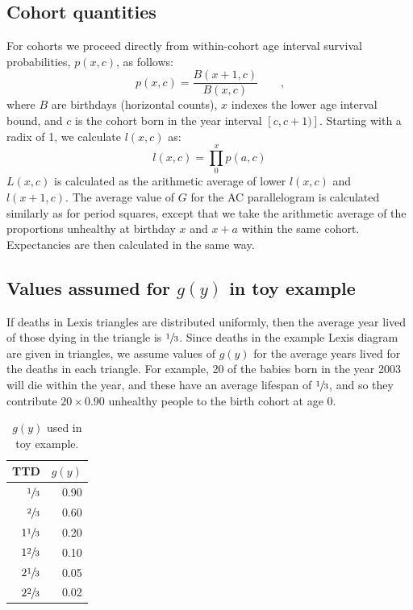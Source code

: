 \documentclass[11pt,oneside,a4paper]{article} %
\newcommand{\tc}{\quad\quad\text{,}}
\begin{document}
\subsection{Cohort quantities}
For cohorts we proceed directly from within-cohort age interval survival
probabilities, $p(x,c)$, as follows:
\begin{equation}
p(x,c) = \frac{B(x+1,c)}{B(x,c)} \tc
\end{equation}
where $B$ are birthdays (horizontal counts), $x$ indexes the lower age interval
bound, and $c$ is the cohort born in the year interval $[c,c+1)]$. Starting with
a radix of 1, we calculate $l(x,c)$ as:
\begin{equation}
l(x,c) = \prod_0^x p(a,c)
\end{equation}
$L(x,c)$ is calculated as the arithmetic average of lower $l(x,c)$ and
$l(x+1,c)$. The average value of $G$ for the AC parallelogram is calculated
similarly as for period squares, except that we take the arithmetic average of
the proportions unhealthy at birthday $x$ and $x+a$ within the same cohort.
Expectancies are then calculated in the same way.

\subsection{Values assumed for $g(y)$ in toy example}
If deaths in Lexis triangles are distributed uniformly, then the average year
lived of those dying in the triangle is $\sfrac{1}{3}$. Since deaths in the
example Lexis diagram are given in triangles, we assume values of $g(y)$ for the
average years lived for the deaths in each triangle. For example, 20 of the
babies born in the year 2003 will die within the year, and these have an average
lifespan of $\sfrac{1}{3}$, and so they contribute $20\times0.90$ unhealthy
people to the birth cohort at age 0. 

 \begin{table}[ht]
\centering
\begin{tabular}{rr}
\hline
TTD & $g(y)$ \\
\hline
$\sfrac{1}{3}$ & 0.90 \\
$\sfrac{2}{3}$ & 0.60 \\
$1\sfrac{1}{3}$ & 0.20 \\
$1\sfrac{2}{3}$ & 0.10 \\
$2\sfrac{1}{3}$ & 0.05 \\
$2\sfrac{2}{3}$ & 0.02 \\
\hline
\end{tabular}
\caption{$g(y)$ used in toy example.}
\label{tab:gy}
\end{table}



\newpage%


\end{document}

